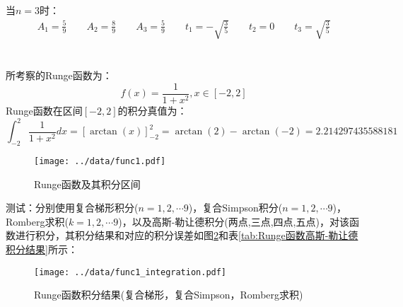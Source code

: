 \documentclass[12pt, onecolumn]{article}
\newcommand\normf{\fangsong}
\begin{document}
	当$n=3$时：
	\begin{equation}
	\begin{aligned}
	A_1
	=\frac{5}{9}
	\qquad A_2
		=\frac{8}{9}
		\qquad A_3
		=\frac{5}{9}
		\qquad t_1=-\sqrt{\frac{3}{5}}\qquad t_2=0\qquad t_3=\sqrt{\frac{3}{5}}
	\end{aligned}
	\end{equation}
	
	\section{\normf{测试}}
	\subsection{\normf{Runge函数}}
	所考察的Runge函数为：
	\begin{equation}
	f(x)=\frac{1}{1+x^2},x\in[-2,2]
	\end{equation}
	Runge函数在区间$[-2,2]$的积分真值为：
	\begin{equation}
	\int_{-2}^{2}\frac{1}{1+x^2}dx=\left[ \arctan(x) \right] _{-2}^{2}=\arctan(2)-\arctan(-2)=2.214297435588181
	\end{equation}
	
	\begin{figure}[h!]
	\centering
		\centering
		\texttt{[image: ../data/func1.pdf]}
	\caption{\normf Runge函数及其积分区间}
	\label{fig:Runge函数及其积分区间}
	\end{figure}
	
	测试：分别使用复合梯形积分($n=1,2,\cdots 9$)，复合Simpson积分($n=1,2,\cdots 9$)，Romberg求积($k=1,2,\cdots 9$)，以及高斯-勒让德积分(两点,三点,四点,五点)，对该函数进行积分，其积分结果和对应的积分误差如图\ref{fig:Runge函数积分结果}和表\ref{tab:Runge函数高斯-勒让德积分结果}所示：
	\begin{figure}[h!]
	\centering
		\centering
		\texttt{[image: ../data/func1\_integration.pdf]}
	\caption{\normf Runge函数积分结果(复合梯形，复合Simpson，Romberg求积)}
	\label{fig:Runge函数积分结果}
	\end{figure}
	
\end{document}
